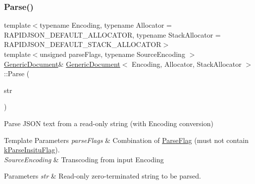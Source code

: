 \subsubsection{\texorpdfstring{Parse()}{Parse()}\hspace{0.1cm}{\footnotesize\ttfamily [1/6]}}
{\footnotesize\ttfamily template$<$typename Encoding, typename Allocator = R\+A\+P\+I\+D\+J\+S\+O\+N\+\_\+\+D\+E\+F\+A\+U\+L\+T\+\_\+\+A\+L\+L\+O\+C\+A\+T\+OR, typename Stack\+Allocator = R\+A\+P\+I\+D\+J\+S\+O\+N\+\_\+\+D\+E\+F\+A\+U\+L\+T\+\_\+\+S\+T\+A\+C\+K\+\_\+\+A\+L\+L\+O\+C\+A\+T\+OR$>$ \\
template$<$unsigned parse\+Flags, typename Source\+Encoding $>$ \\
\hyperlink{classGenericDocument}{Generic\+Document}\& \hyperlink{classGenericDocument}{Generic\+Document}$<$ Encoding, Allocator, Stack\+Allocator $>$\+::Parse (\begin{DoxyParamCaption}\item[{const typename Source\+Encoding\+::\+Ch $\ast$}]{str }\end{DoxyParamCaption})\hspace{0.3cm}{\ttfamily [inline]}}



Parse J\+S\+ON text from a read-\/only string (with Encoding conversion) 


\begin{DoxyTemplParams}{Template Parameters}
{\em parse\+Flags} & Combination of \hyperlink{reader_8h_ab7be7dabe6ffcba60fad441505583450}{Parse\+Flag} (must not contain \hyperlink{reader_8h_ab7be7dabe6ffcba60fad441505583450a13188bd483b4df0b6582bebe2aeb5b01}{k\+Parse\+Insitu\+Flag}). \\
\hline
{\em Source\+Encoding} & Transcoding from input Encoding \\
\hline
\end{DoxyTemplParams}

\begin{DoxyParams}{Parameters}
{\em str} & Read-\/only zero-\/terminated string to be parsed. \\
\hline
\end{DoxyParams}
\mbox{\label{classGenericDocument_a5e377f840009b5cee6757be29525ce0b}} 
